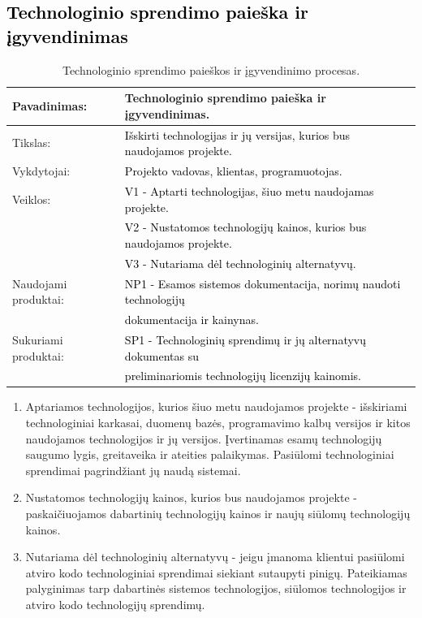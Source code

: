 \documentclass{VUMIFPSkursinis}
\begin{document}
	\subsection{\textcolor{black}{Technologinio sprendimo paieška ir įgyvendinimas}}
	\begin{center}
		\begin{table}[ht]
			\caption{Technologinio sprendimo paieškos ir įgyvendinimo procesas.}
			\begin{tabular}{ | l | l | }
				\hline
				Pavadinimas:          & Technologinio sprendimo paieška ir įgyvendinimas.									\\ \hline
				Tikslas:              & \textcolor{black}{Išskirti technologijas ir jų versijas, kurios bus naudojamos projekte. 	}					\\ \hline
				Vykdytojai:           & \textcolor{black}{Projekto vadovas, klientas, programuotojas.}										\\ \hline
				Veiklos:              & \textcolor{black}{V1 - Aptarti technologijas, šiuo metu naudojamas projekte.} 								\\
				                      & \textcolor{black}{V2 - Nustatomos technologijų kainos, kurios bus naudojamos projekte.}							\\
				                      & \textcolor{black}{V3 - Nutariama dėl technologinių alternatyvų.	}									\\ \hline
				Naudojami produktai:	& \textcolor{black}{NP1 - Esamos sistemos dokumentacija, norimų naudoti technologijų} \\& \textcolor{black}{dokumentacija ir kainynas. 	}		\\ \hline
				Sukuriami produktai:	& \textcolor{black}{SP1 - Technologinių sprendimų ir jų alternatyvų dokumentas su} \\& \textcolor{black}{preliminariomis technologijų licenzijų kainomis.}	\\ \hline
			\end{tabular}
		\end{table}
	\end{center}
	\newpage
	\begin{enumerate}
		\item{
			Aptariamos technologijos, kurios šiuo metu naudojamos projekte - išskiriami technologiniai karkasai, duomenų bazės, programavimo kalbų versijos ir kitos naudojamos technologijos ir jų versijos.
			Įvertinamas esamų technologijų saugumo lygis, greitaveika ir ateities palaikymas.
			Pasiūlomi technologiniai sprendimai pagrindžiant jų naudą sistemai.
		}
		\item{Nustatomos technologijų kainos, kurios bus naudojamos projekte - paskaičiuojamos dabartinių technologijų kainos ir naujų siūlomų technologijų kainos.}
		\item{
			Nutariama dėl technologinių alternatyvų - jeigu įmanoma klientui pasiūlomi atviro kodo technologiniai sprendimai siekiant sutaupyti pinigų.
			Pateikiamas palyginimas tarp dabartinės sistemos technologijos, siūlomos technologijos ir atviro kodo technologijų sprendimų.
		}
	\end{enumerate}
\end{document}
